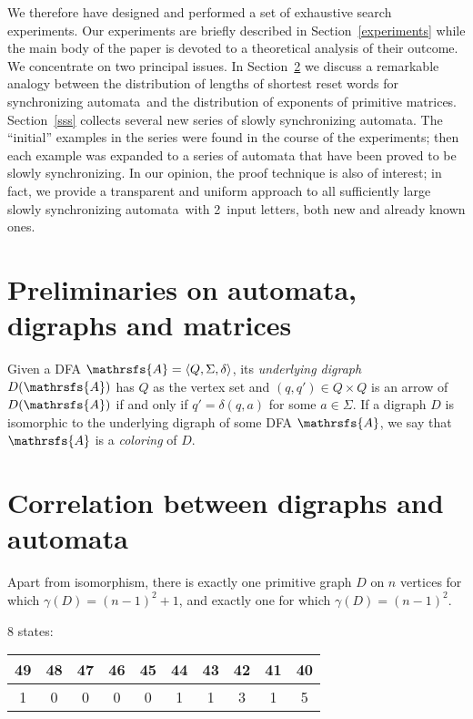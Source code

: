 \documentclass[11pt]{llncs}
\newcommand{\sa}{synchronizing automata}
\begin{document}
We therefore have designed and performed a set of exhaustive search
experiments. Our experiments are briefly described in Section~\ref{experiments}
while the main body of the paper is devoted to a theoretical analysis
of their outcome. We concentrate on two principal issues. In Section~\ref{matrices}
we discuss a remarkable analogy between the distribution of lengths of shortest
reset words for \sa\ and the distribution of exponents of primitive matrices.
Section~\ref{sss} collects several new series of slowly \sa. The ``initial''
examples in the series were found in the course of the experiments; then
each example was expanded to a series of automata that have been proved
to be slowly synchronizing. In our opinion, the proof technique is also
of interest; in fact, we provide a transparent and uniform approach to all
sufficiently large slowly \sa\ with 2~input letters, both new and already
known ones.

\section{Preliminaries on automata, digraphs and matrices}
\label{preliminaries}

Given a DFA $\mathrsfs{A}=\langle Q,\Sigma,\delta\rangle$, its \emph{underlying
digraph} $D(\mathrsfs{A})$ has $Q$ as the vertex set and $(q,q')\in Q\times Q$ is
an arrow of $D(\mathrsfs{A})$ if and only if $q'=\delta(q,a)$ for some $a\in\Sigma$.
If a digraph $D$ is isomorphic to the underlying digraph of some DFA $\mathrsfs{A}$,
we say that $\mathrsfs{A}$ is a \emph{coloring} of $D$.


\section{Correlation between digraphs and automata}
\label{matrices}

\begin{theorem}\label{dulmage}
Apart from isomorphism, there is exactly one primitive graph $D$
on $n$ vertices for which $\gamma(D) = (n - 1)^2 + 1$, and exactly one
for which $\gamma(D) = (n - 1)^2$.
\end{theorem}

8 states:\\

\begin{tabular}{|c|c|c|c|c|c|c|c|c|c|}
49 & 48 & 47 & 46 & 45 & 44 & 43 & 42 & 41 & 40 \\
\hline
1  & 0  & 0  & 0  & 0  & 1  & 1  & 3  & 1  & 5  \\
\end{tabular}
\vspace{0.7cm}
\end{document}
